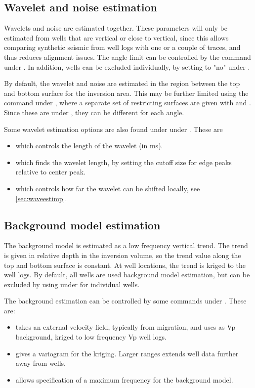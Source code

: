 \subsection{Wavelet and noise estimation}
Wavelets and noise are estimated together. These parameters will only be estimated from wells that are vertical or close to vertical, since this allows comparing synthetic seismic from well logs with one or a couple of traces, and thus reduces alignment issues. The angle limit can be controlled by the  command under . In addition, wells can be excluded individually, by setting  to "no" under .

By default, the wavelet and noise are estimated in the region between the top and bottom surface for the inversion area. This may be further limited using the  command under , where a separate set of restricting surfaces are given with  and . Since these are under , they can be different for each angle.

Some wavelet estimation options are also found under  under . These are
\begin{itemize}
\item {} which controls the length of the wavelet (in ms).
\item {} which finds the wavelet length, by setting the cutoff size for edge peaks relative to center peak.
\item {} which controls how far the wavelet can be shifted locally, see \autoref{sec:waveestimp}.
\end{itemize}

\subsection{Background model estimation}
The background model is estimated as a low frequency vertical trend. The trend is given in relative depth in the inversion volume, so the trend value along the top and bottom surface is constant. At well locations, the trend is kriged to the well logs. By default, all wells are used background model estimation, but can be excluded by using  under  for individual wells.

The background estimation can be controlled by some commands under . These are:
\begin{itemize}
\item {} takes an external velocity field, typically from migration, and uses as Vp background, kriged to low frequency Vp well logs.
\item {} gives a variogram for the kriging. Larger ranges extends well data further away from wells.
\item {} allows specification of a maximum frequency for the background model.
\end{itemize}


